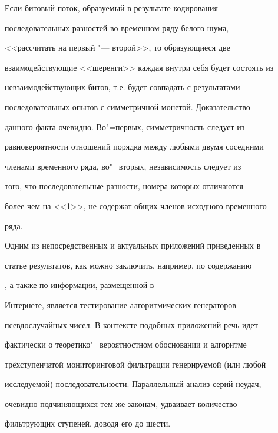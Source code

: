 Если битовый поток, образуемый в результате кодирования

последовательных разностей во временном ряду белого шума,

<<рассчитать на первый "--- второй>>, то образующиеся две

взаимодействующие <<шеренги>> каждая внутри себя будет состоять из

невзаимодействующих битов, т.е. будет совпадать с результатами

последовательных опытов с симметричной монетой. Доказательство

данного факта очевидно. Во"=первых, симметричность следует из

равновероятности отношений порядка между любыми двумя соседними

членами временного ряда, во"=вторых, независимость следует из

того, что последовательные разности, номера которых отличаются

более чем на <<1>>, не содержат общих членов исходного временного

ряда.



Одним из непосредственных и актуальных приложений приведенных в

статье результатов, как можно заключить, например, по содержанию

\cite{barvinok:bib6}, а также по информации, размещенной в

Интернете, является тестирование алгоритмических генераторов

псевдослучайных чисел. В контексте подобных приложений речь идет

фактически о теоретико"=вероятностном обосновании и алгоритме

трёхступенчатой мониторинговой фильтрации генерируемой (или любой

исследуемой) последовательности. Параллельный анализ серий неудач,

очевидно подчиняющихся тем же законам, удваивает количество

фильтрующих ступеней, доводя его до шести.




